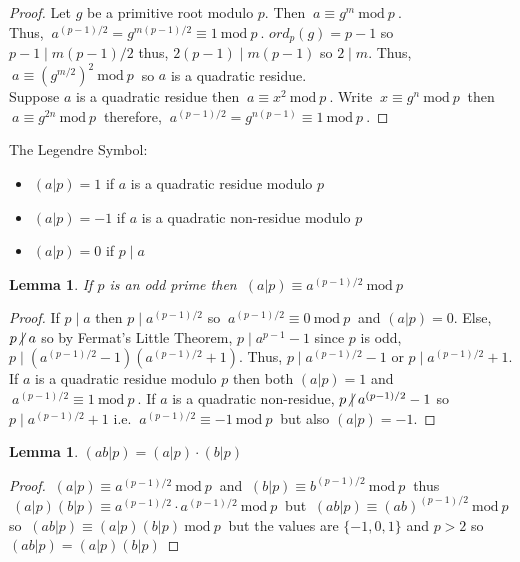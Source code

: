 \documentclass[12pt]{extarticle}
\renewcommand\qedsymbol{$\square$}
\newcommand{\divides}{\mid}
\newcommand{\ndivides}{\centernot \mid}
\newtheorem{lemma}[theorem]{Lemma}
\newenvironment{definition}[1][Definition:]{\begin{trivlist}
\item[\hskip \labelsep {\bfseries #1}]}{\end{trivlist}}
\newenvironment{lproof}{\begin{proof} \renewcommand{\qedsymbol}{}}{\end{proof}}
\renewcommand{\mod}[3]{\: #1 \equiv #2 \: \mathrm{mod} \: #3 \:}
\begin{document}
\begin{lproof}
Let $g$ be a primitive root modulo $p$. Then $\mod{a}{g^m}{p}$. \\ Thus, $\mod{a^{(p-1)/2} = g^{m(p-1)/2}}{1}{p}$.  $ord_p(g) = p-1$ so $p-1 \divides m(p-1)/2$ thus, $2(p-1) \divides m(p-1)$ so $2 \divides m$. Thus, $\mod{a}{(g^{m/2})^2}{p}$ so $a$ is a quadratic residue. \\
Suppose $a$ is a quadratic residue then $\mod{a}{x^2}{p}$. Write $\mod{x}{g^n}{p}$ then $\mod{a}{g^{2n}}{p}$ therefore, $\mod{a^{(p-1)/2} = g^{n(p-1)}}{1}{p}$.
\end{lproof}

\begin{definition}
The Legendre Symbol: 
\begin{itemize}
\item $(a|p) = 1$ if $a$ is a quadratic residue modulo $p$
\item $(a|p) = -1$ if $a$ is a quadratic non-residue modulo $p$ 
\item $(a|p) = 0$ if $p \divides a$
\end{itemize}
\end{definition}

\begin{lemma}
If $p$ is an odd prime then $\mod{(a|p)}{a^{(p-1)/2}}{p}$ 
\end{lemma}

\begin{lproof}
If $p \divides a$ then $p \divides a^{(p-1)/2}$ so $\mod{a^{(p-1)/2}}{0}{p}$ and $(a|p) = 0$.
Else, $p \ndivides a$ so by Fermat's Little Theorem, $p \divides a^{p-1}-1$ since $p$ is odd, $p \divides (a^{(p-1)/2}-1)(a^{(p-1)/2}+1)$. Thus, $p \divides a^{(p-1)/2}-1$ or $p \divides a^{(p-1)/2}+1$. If $a$ is a quadratic residue modulo $p$ then both $(a|p) = 1$ and $\mod{a^{(p-1)/2}}{1}{p}$. If $a$ is a quadratic non-residue, $p \ndivides a^{(p-1)/2}-1$ so $p \divides a^{(p-1)/2}+1$ i.e. $\mod{a^{(p-1)/2}}{-1}{p}$ but also $(a|p) = -1$.
\end{lproof}

\begin{lemma}
$(ab|p) = (a|p) \cdot (b|p)$
\end{lemma}

\begin{lproof}
$\mod{(a|p)}{a^{(p-1)/2}}{p}$ and $\mod{(b|p)}{b^{(p-1)/2}}{p}$ thus \\ $\mod{(a|p)(b|p)}{a^{(p-1)/2} \cdot a^{(p-1)/2}}{p}$ but $\mod{(ab|p)}{(ab)^{(p-1)/2}}{p}$ so $\mod{(ab|p)}{(a|p)(b|p)}{p}$ but the values are $\{-1,0,1\}$ and $p > 2$ so $(ab|p) = (a|p)(b|p)$
\end{lproof}
\end{document}
